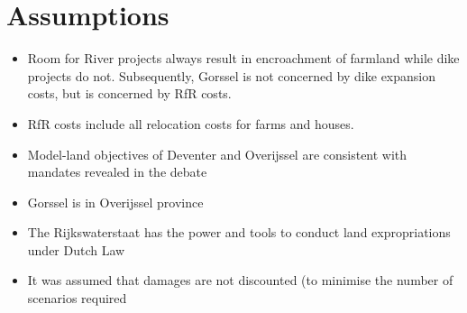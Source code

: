 
\section{Assumptions}
\begin{itemize}
    \item Room for River projects always result in encroachment of farmland while dike projects do not. Subsequently, Gorssel is not concerned by dike expansion costs, but is concerned by RfR costs.
    \item RfR costs include all relocation costs for farms and houses.
    \item Model-land objectives of Deventer and Overijssel are consistent with mandates revealed in the debate
    \item Gorssel is in Overijssel province
    \item The Rijkswaterstaat has the power and tools to conduct land expropriations under Dutch Law
    \item It was assumed that damages are not discounted (to minimise the number of scenarios required
\end{itemize}





